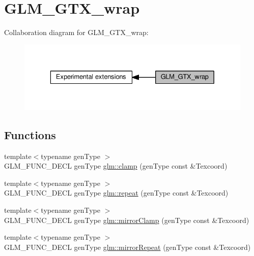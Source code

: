 \hypertarget{group__gtx__wrap}{}\section{G\+L\+M\+\_\+\+G\+T\+X\+\_\+wrap}
\label{group__gtx__wrap}
Collaboration diagram for G\+L\+M\+\_\+\+G\+T\+X\+\_\+wrap\+:
\nopagebreak
\begin{figure}[H]
\begin{center}
\leavevmode
\includegraphics[width=329pt]{d4/d76/group__gtx__wrap}
\end{center}
\end{figure}
\subsection*{Functions}
\begin{DoxyCompactItemize}
\item 
{\footnotesize template$<$typename gen\+Type $>$ }\\G\+L\+M\+\_\+\+F\+U\+N\+C\+\_\+\+D\+E\+CL gen\+Type \hyperlink{group__gtx__wrap_ga6c0cc6bd1d67ea1008d2592e998bad33}{glm\+::clamp} (gen\+Type const \&Texcoord)
\item 
{\footnotesize template$<$typename gen\+Type $>$ }\\G\+L\+M\+\_\+\+F\+U\+N\+C\+\_\+\+D\+E\+CL gen\+Type \hyperlink{group__gtx__wrap_ga809650c6310ea7c42666e918c117fb6f}{glm\+::repeat} (gen\+Type const \&Texcoord)
\item 
{\footnotesize template$<$typename gen\+Type $>$ }\\G\+L\+M\+\_\+\+F\+U\+N\+C\+\_\+\+D\+E\+CL gen\+Type \hyperlink{group__gtx__wrap_gaa6856a0a048d2749252848da35e10c8b}{glm\+::mirror\+Clamp} (gen\+Type const \&Texcoord)
\item 
{\footnotesize template$<$typename gen\+Type $>$ }\\G\+L\+M\+\_\+\+F\+U\+N\+C\+\_\+\+D\+E\+CL gen\+Type \hyperlink{group__gtx__wrap_ga16a89b0661b60d5bea85137bbae74d73}{glm\+::mirror\+Repeat} (gen\+Type const \&Texcoord)
\end{DoxyCompactItemize}


